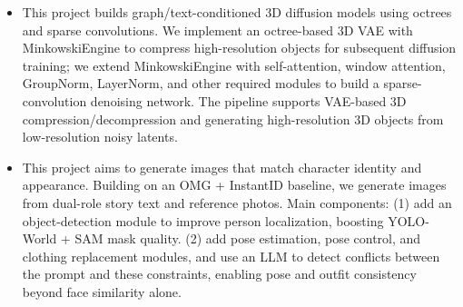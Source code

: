 \documentclass{resume}
\begin{document}
\vspace{-0.5ex}
\begin{onehalfspacing}
\begin{itemize}
\item
This project builds graph/text-conditioned 3D diffusion models using octrees and sparse convolutions. We implement an octree-based 3D VAE with MinkowskiEngine to compress high-resolution objects for subsequent diffusion training; we extend MinkowskiEngine with self-attention, window attention, GroupNorm, LayerNorm, and other required modules to build a sparse-convolution denoising network. The pipeline supports VAE-based 3D compression/decompression and generating high-resolution 3D objects from low-resolution noisy latents.
\end{itemize}
\end{onehalfspacing}

\vspace{-0.5ex}
\begin{onehalfspacing}
\begin{itemize}
\item
This project aims to generate images that match character identity and appearance. Building on an OMG + InstantID baseline, we generate images from dual-role story text and reference photos. Main components: (1) add an object-detection module to improve person localization, boosting YOLO-World + SAM mask quality. (2) add pose estimation, pose control, and clothing replacement modules, and use an LLM to detect conflicts between the prompt and these constraints, enabling pose and outfit consistency beyond face similarity alone.
\end{itemize}
\end{onehalfspacing}
\end{document}
